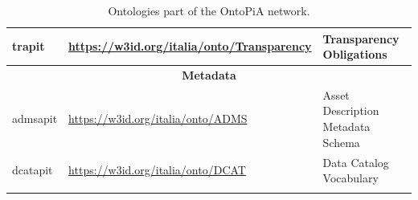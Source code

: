 \begin{longtable}[c]{lll}
  \multicolumn{1}{|p{0.2\textwidth}|}{trapit}        & \multicolumn{1}{p{0.4\textwidth}|}{\url{https://w3id.org/italia/onto/Transparency}}     & \multicolumn{1}{p{0.4\textwidth}|}{Transparency Obligations}                   \\ \hline
  \multicolumn{3}{|c|}{\textbf{Metadata}}                                                                                                                                    \\ \hline
  \multicolumn{1}{|p{0.2\textwidth}|}{admsapit}      & \multicolumn{1}{p{0.4\textwidth}|}{\url{https://w3id.org/italia/onto/ADMS}}             & \multicolumn{1}{p{0.4\textwidth}|}{Asset Description Metadata Schema}          \\ \hline
  \multicolumn{1}{|p{0.2\textwidth}|}{dcatapit}      & \multicolumn{1}{p{0.4\textwidth}|}{\url{https://w3id.org/italia/onto/DCAT}}             & \multicolumn{1}{p{0.4\textwidth}|}{Data Catalog Vocabulary}                   \\ \hline
  \caption{Ontologies part of the OntoPiA network.}
  \label{tab:ontopia-ontologies}\\
\end{longtable}